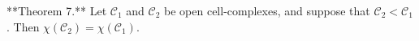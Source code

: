 **Theorem 7.** Let $\mathcal{C}_1$ and $\mathcal{C}_2$ be open cell-complexes, and suppose that $\mathcal{C}_2 < \mathcal{C}_1$. Then $\chi(\mathcal{C}_2) = \chi(\mathcal{C}_1)$.
